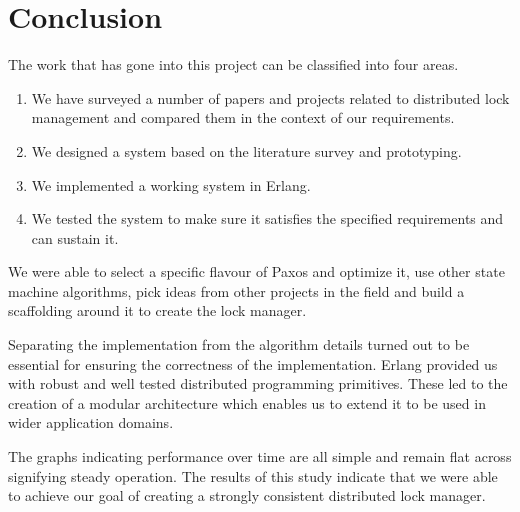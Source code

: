\chapter{Conclusion}
\label{chapter:conclusion}

The work that has gone into this project can be classified into four areas.

\begin{enumerate}
  \item We have surveyed a number of papers and projects related to distributed
    lock management and compared them in the context of our requirements.
  \item We designed a system based on the literature survey and prototyping.
  \item We implemented a working system in Erlang.
  \item We tested the system to make sure it satisfies the specified
    requirements and can sustain it.
\end{enumerate}

We were able to select a specific flavour of Paxos and optimize it, use other
state machine algorithms, pick ideas from other projects in the field and build
a scaffolding around it to create the lock manager.

Separating the implementation from the algorithm details turned out
to be essential for ensuring the correctness of the implementation. Erlang
provided us with robust and well tested distributed programming primitives.
These led to the creation of a modular architecture which enables us to extend
it to be used in wider application domains.

The graphs indicating performance over time are all simple and remain flat
across signifying steady operation. The results of this study indicate that
we were able to achieve our goal of creating a strongly consistent
distributed lock manager.

